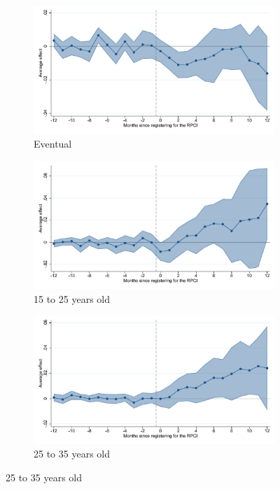 \begin{figure}[H]
    \begin{subfigure}{0.32\textwidth}
    \caption{Eventual}
    \includegraphics[width=\textwidth]{04_Figures/muestra_10porciento/event_study_log_sal_cierre_base_te_dcdh_connected.pdf}
    \end{subfigure}
    \begin{subfigure}{0.32\textwidth}
    \caption{15 to 25 years old}
    \includegraphics[width=\textwidth]{04_Figures/muestra_10porciento/event_study_log_sal_cierre_age_15_25_dcdh_connected.pdf}
    \end{subfigure}
    \begin{subfigure}{0.32\textwidth}
    \caption{25 to 35 years old}
    \includegraphics[width=\textwidth]{04_Figures/muestra_10porciento/event_study_log_sal_cierre_age_25_35_dcdh_connected.pdf}
    \end{subfigure}


\end{figure}
